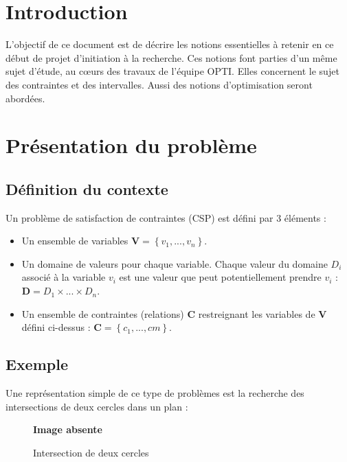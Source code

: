 \section{Introduction }
L'objectif de ce document est de décrire les notions essentielles à retenir en ce début de projet d'initiation à la recherche. Ces notions font parties d'un même sujet d'étude, au cœurs des travaux de l'équipe OPTI. Elles concernent le sujet des contraintes et des intervalles. Aussi des notions d'optimisation seront abordées.

\section{Présentation du problème}
\subsection{Définition du contexte}
Un problème de satisfaction de contraintes (CSP) est défini par 3 éléments : 
\begin{itemize}
\item
Un ensemble de variables $\mathbf{V} = \left\{ v_1,...,v_n \right\}$.
\item
Un domaine de valeurs pour chaque variable. Chaque valeur du domaine $D_i$ associé à la variable $v_i$ est une valeur que peut potentiellement prendre $v_i$ : $\mathbf{D} = D_1 \times ... \times D_n $.
\item
Un ensemble de contraintes (relations) $\mathbf{C}$ restreignant les variables de $\mathbf{V}$ défini ci-dessus :  $\mathbf{C} = \left\{c_1,...,cm\right\}$. 
\end{itemize}

\subsection{Exemple}

Une représentation simple de ce type de problèmes est la recherche des intersections de deux cercles dans un plan :
\begin{figure}[h] %
  \center
  \bf \Huge Image absente
  \caption{Intersection de deux cercles} %
 \label{fig:Deuxcerlces} %
\end{figure} %

